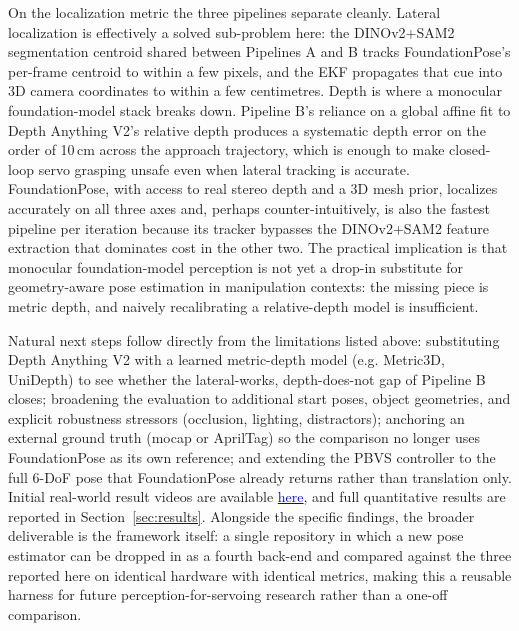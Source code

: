 \documentclass[letterpaper, 10 pt, conference]{ieeeconf}  %
\begin{document}
On the localization metric the three pipelines separate cleanly. Lateral localization is effectively a solved sub-problem here: the DINOv2+SAM2 segmentation centroid shared between Pipelines A and B tracks FoundationPose's per-frame centroid to within a few pixels, and the EKF propagates that cue into 3D camera coordinates to within a few centimetres. Depth is where a monocular foundation-model stack breaks down. Pipeline B's reliance on a global affine fit to Depth Anything V2's relative depth produces a systematic depth error on the order of 10\,cm across the approach trajectory, which is enough to make closed-loop servo grasping unsafe even when lateral tracking is accurate. FoundationPose, with access to real stereo depth and a 3D mesh prior, localizes accurately on all three axes and, perhaps counter-intuitively, is also the fastest pipeline per iteration because its tracker bypasses the DINOv2+SAM2 feature extraction that dominates cost in the other two. The practical implication is that monocular foundation-model perception is not yet a drop-in substitute for geometry-aware pose estimation in manipulation contexts: the missing piece is metric depth, and naively recalibrating a relative-depth model is insufficient.

Natural next steps follow directly from the limitations listed above: substituting Depth Anything V2 with a learned metric-depth model (e.g. Metric3D, UniDepth) to see whether the lateral-works, depth-does-not gap of Pipeline B closes; broadening the evaluation to additional start poses, object geometries, and explicit robustness stressors (occlusion, lighting, distractors); anchoring an external ground truth (mocap or AprilTag) so the comparison no longer uses FoundationPose as its own reference; and extending the PBVS controller to the full 6-DoF pose that FoundationPose already returns rather than translation only. Initial real-world result videos are available \href{https://drive.google.com/file/d/1beLwBDPymnEFNrw9vw_qGlmb-9raleHW/view?usp=sharing}{\textcolor{blue}{here}}, and full quantitative results are reported in Section~\ref{sec:results}. Alongside the specific findings, the broader deliverable is the framework itself: a single repository in which a new pose estimator can be dropped in as a fourth back-end and compared against the three reported here on identical hardware with identical metrics, making this a reusable harness for future perception-for-servoing research rather than a one-off comparison.


\end{document}
